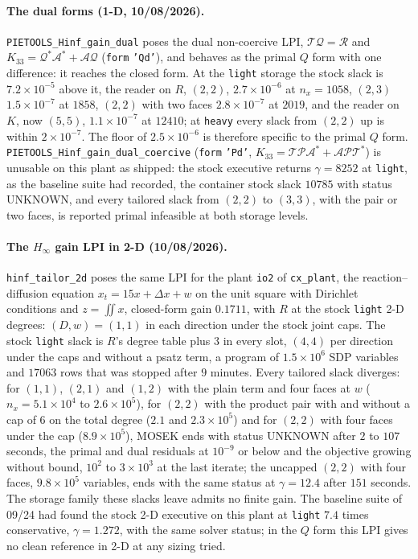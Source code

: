\documentclass[12pt]{article}
\newcommand{\mcl}[1]{\mathcal{#1}}
\newcommand{\code}[1]{\texttt{#1}}
\theoremstyle{plain}
\theoremstyle{definition}
\theoremstyle{remark}
\begin{document}
\paragraph{The dual forms (1-D, 10/08/2026).} \code{PIETOOLS\_Hinf\_gain\_dual} poses the dual non-coercive LPI, $\mcl T\mcl Q=\mcl R$ and $K_{33}=\mcl Q^*\mcl A^*+\mcl A\mcl Q$ (\code{form} \code{'Qd'}), and behaves as the primal $Q$ form with one difference: it reaches the closed form. At the \code{light} storage the stock slack is $7.2\times10^{-5}$ above it, the reader on $R$, $(2,2)$, $2.7\times10^{-6}$ at $n_x=1058$, $(2,3)$ $1.5\times10^{-7}$ at $1858$, $(2,2)$ with two faces $2.8\times10^{-7}$ at $2019$, and the reader on $K$, now $(5,5)$, $1.1\times10^{-7}$ at $12410$; at \code{heavy} every slack from $(2,2)$ up is within $2\times10^{-7}$. The floor of $2.5\times10^{-6}$ is therefore specific to the primal $Q$ form. \code{PIETOOLS\_Hinf\_gain\_dual\_coercive} (\code{form} \code{'Pd'}, $K_{33}=\mcl T\mcl P\mcl A^*+\mcl A\mcl P\mcl T^*$) is unusable on this plant as shipped: the stock executive returns $\gamma=8252$ at \code{light}, as the baseline suite had recorded, the container stock slack $10785$ with status UNKNOWN, and every tailored slack from $(2,2)$ to $(3,3)$, with the pair or two faces, is reported primal infeasible at both storage levels.


\paragraph{The $H_\infty$ gain LPI in 2-D (10/08/2026).} \code{hinf\_tailor\_2d} poses the same LPI for the plant \code{io2} of \code{cx\_plant}, the reaction--diffusion equation $x_t=15x+\Delta x+w$ on the unit square with Dirichlet conditions and $z=\iint x$, closed-form gain $0.1711$, with $R$ at the stock \code{light} 2-D degrees: $(D,w)=(1,1)$ in each direction under the stock joint caps. The stock \code{light} slack is $R$'s degree table plus $3$ in every slot, $(4,4)$ per direction under the caps and without a psatz term, a program of $1.5\times10^{6}$ SDP variables and $17063$ rows that was stopped after $9$ minutes. Every tailored slack diverges: for $(1,1)$, $(2,1)$ and $(1,2)$ with the plain term and four faces at $w$ ($n_x=5.1\times10^{4}$ to $2.6\times10^{5}$), for $(2,2)$ with the product pair with and without a cap of $6$ on the total degree ($2.1$ and $2.3\times10^{5}$) and for $(2,2)$ with four faces under the cap ($8.9\times10^{5}$), MOSEK ends with status UNKNOWN after $2$ to $107$ seconds, the primal and dual residuals at $10^{-9}$ or below and the objective growing without bound, $10^{2}$ to $3\times10^{3}$ at the last iterate; the uncapped $(2,2)$ with four faces, $9.8\times10^{5}$ variables, ends with the same status at $\gamma=12.4$ after $151$ seconds. The storage family these slacks leave admits no finite gain. The baseline suite of 09/24 had found the stock 2-D executive on this plant at \code{light} $7.4$ times conservative, $\gamma=1.272$, with the same solver status; in the $Q$ form this LPI gives no clean reference in 2-D at any sizing tried.
\end{document}

